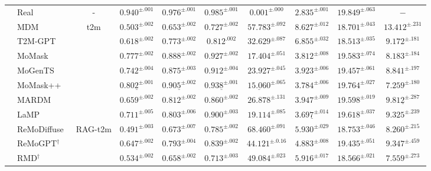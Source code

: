 \documentclass[10pt,journal,compsoc]{IEEEtran}
\begin{document}
\begin{table}[t]
{\begin{tabular}{l|l| c | c c c| c |c| c| c}
        \midrule
        \rule{0pt}{1.5ex} %
        \multirow{14}{*}{\rotatebox{90}{\textbf{SnapMoGen}}} &
        Real & - & $0.940^{\pm.001}$ & $0.976^{\pm.001}$  & $0.985^{\pm.001}$ &$0.001^{\pm.000}$ & $2.835^{\pm.001}$& $19.849^{\pm.063}$ & $-$ \\
        \cmidrule{2-10}
        & MDM~\cite{mdm} & \multirow{7}{*}{t2m} &$0.503^{\pm.002}$& $0.653^{\pm.002}$& $0.727^{\pm.002}$ & $57.783^{\pm.092}$ & $8.627^{\pm.012}$ & $18.701^{\pm.043}$ & $\mathbf{13.412^{\pm.231}}$\\
        & T2M-GPT~\cite{t2m-gpt} & &$0.618^{\pm.002}$& $0.773^{\pm.002}$& $0.812^{.002}$ & $32.629^{\pm.087}$&$6.855^{\pm.032}$& $18.513^{\pm.035}$ & $9.172^{\pm.181}$\\
        & MoMask~\cite{momask} & &$0.777^{\pm.002}$& $0.888^{\pm.002}$& $0.927^{\pm.002}$ & $17.404^{\pm.051}$&$3.812^{\pm{.008}}$& $19.583^{\pm.074}$ & $8.183^{\pm.184}$\\
        & MoGenTS~\cite{mogents} & &$0.742^{\pm.004}$& $0.875^{\pm.003}$& $0.912^{\pm.004}$ & $23.927^{\pm.045}$ & $3.923^{\pm.006}$& $19.457^{\pm.061}$ &$8.841^{\pm{.197}}$\\
        & MoMask++~\cite{momask2} & &$\underline{0.802^{\pm.001}}$& $\underline{0.905^{\pm.002}}$& $\underline{0.938^{\pm.001}}$ & $\underline{15.060}^{\pm.065}$&$3.784^{\pm{.006}}$& $\mathbf{19.764^{\pm{.027}}}$&$7.259^{\pm.180}$\\
        & MARDM~\cite{mardm} & &$0.659^{\pm.002}$& $0.812^{\pm.002}$& $0.860^{\pm.002}$ & $26.878^{\pm.131}$&$3.947^{\pm.009}$& $19.598^{\pm.019}$ & $\underline{9.812^{\pm.287}}$\\
        & LaMP~\cite{lamp} & &$0.711^{\pm.005}$ &$0.803^{\pm.006}$&$0.900^{\pm.003}$&$19.114^{\pm.085}$ & $\underline{3.697^{\pm.014}}$ & $19.618^{\pm.037}$ & $9.325^{\pm.239}$\\
        \cline{2-10}
        \rule{0pt}{2.5ex} %
        & ReMoDiffuse~\cite{remodiffuse} & \multirow{6}{*}{RAG-t2m}  &$0.491^{\pm.003}$& $0.673^{\pm.007}$& $0.785^{\pm.002}$ & $68.460^{\pm.091}$ & $5.930^{\pm{.029}}$ & $18.753^{\pm.046}$ & $8.260^{\pm{.215}}$\\
        & ReMoGPT$^{\dag}$~\cite{remogpt} & &$0.647^{\pm.002}$& $0.793^{\pm.004}$& $0.839^{\pm.002}$ & $44.121^{\pm.0.16}$&$4.883^{\pm{.008}}$& $19.435^{\pm.051}$ & $9.347^{\pm{.459}}$\\
        & RMD$^{\dag}$~\cite{rmd} & &$0.534^{\pm.002}$& $0.658^{\pm.002}$& $0.713^{\pm.003}$ & $49.084^{\pm.023}$ & $5.916^{\pm{.017}}$& $18.566^{\pm.021}$ & $7.559^{\pm{.273}}$\\

\end{tabular}}
\end{table}
\end{document}

